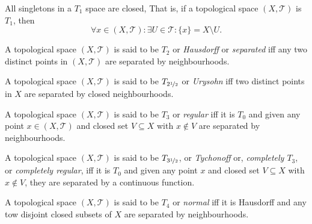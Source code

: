 \begin{proposition}
	\label{prop: all singletons in a T_1 space are closed}
	
	All singletons in a $T_1$ space are closed, That is, if a topological space $(X, \mathcal T)$ is $T_1$, then
	$$
	\forall x \in (X, \mathcal T) : \exists U \in \mathcal T : \{x\} = X \setminus U.
	$$
\end{proposition}


\begin{definition}
	[$T_2$ spaces]
	\label{def: T_2 spaces}
	A topological space $(X, \mathcal T)$ is said to be $T_2$ or \textit{Hausdorff} or \textit{separated} iff any two distinct points in $(X, \mathcal T)$ are separated by neighbourhoods.
\end{definition}


\begin{definition}
	\label{def: T_2.5 spaces}
	A topological space $(X, \mathcal T)$ is said to be $T_{2 \nicefrac{1}{2}}$ or \textit{Urysohn} iff two distinct points in $X$ are separated by closed neighbourhoods.
\end{definition}


\begin{definition}
	[$T_3$ spaces]
	\label{def: T_3 spaces}
	A topological space $(X, \mathcal T)$ is said to be $T_3$ or \textit{regular} iff it is $T_0$ and given any point $x \in (X, \mathcal T)$ and closed set $V \subseteq X$ with $x \notin V$ are separated by neighbourhoods.
\end{definition}


\begin{definition}
	\label{def: T_3.5 spaces}
	A topological space $(X, \mathcal T)$ is said to be $T_{3 \nicefrac{1}{2}}$, or \textit{Tychonoff} or, \textit{completely $T_3$}, or \textit{completely regular}, iff it is $T_0$ and given any point $x$ and closed set $V \subseteq X$ with $x \notin V$, they are separated by a continuous function.
\end{definition}


\begin{definition}
	[$T_4$ spaces]
	\label{def: T_4 spaces}
	A topological space $(X, \mathcal T)$ is said to be $T_4$ or \textit{normal} iff it is Hausdorff and any tow disjoint closed subsets of $X$ are separated by neighbourhoods.
\end{definition}


